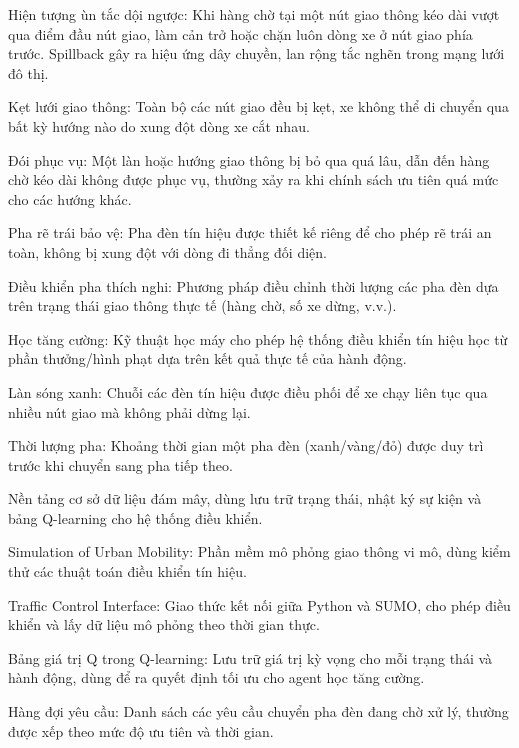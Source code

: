 \documentclass[12pt,a4paper,oneside]{report}
\begin{document}
\begin{description}[leftmargin=2.5em,style=nextline]
    \item[\textbf{Spillback}] Hiện tượng ùn tắc dội ngược: Khi hàng chờ tại một nút giao thông kéo dài vượt qua điểm đầu nút giao, làm cản trở hoặc chặn luôn dòng xe ở nút giao phía trước. Spillback gây ra hiệu ứng dây chuyền, lan rộng tắc nghẽn trong mạng lưới đô thị.
    \item[\textbf{Gridlock}] Kẹt lưới giao thông: Toàn bộ các nút giao đều bị kẹt, xe không thể di chuyển qua bất kỳ hướng nào do xung đột dòng xe cắt nhau.
    \item[\textbf{Starvation}] Đói phục vụ: Một làn hoặc hướng giao thông bị bỏ qua quá lâu, dẫn đến hàng chờ kéo dài không được phục vụ, thường xảy ra khi chính sách ưu tiên quá mức cho các hướng khác.
    \item[\textbf{Protected left}] Pha rẽ trái bảo vệ: Pha đèn tín hiệu được thiết kế riêng để cho phép rẽ trái an toàn, không bị xung đột với dòng đi thẳng đối diện.
    \item[\textbf{Adaptive Phase Control (APC)}] Điều khiển pha thích nghi: Phương pháp điều chỉnh thời lượng các pha đèn dựa trên trạng thái giao thông thực tế (hàng chờ, số xe dừng, v.v.).
    \item[\textbf{Reinforcement Learning (RL)}] Học tăng cường: Kỹ thuật học máy cho phép hệ thống điều khiển tín hiệu học từ phần thưởng/hình phạt dựa trên kết quả thực tế của hành động.
    \item[\textbf{Green wave}] Làn sóng xanh: Chuỗi các đèn tín hiệu được điều phối để xe chạy liên tục qua nhiều nút giao mà không phải dừng lại.
    \item[\textbf{Phase duration}] Thời lượng pha: Khoảng thời gian một pha đèn (xanh/vàng/đỏ) được duy trì trước khi chuyển sang pha tiếp theo.
    \item[\textbf{Supabase}] Nền tảng cơ sở dữ liệu đám mây, dùng lưu trữ trạng thái, nhật ký sự kiện và bảng Q-learning cho hệ thống điều khiển.
    \item[\textbf{SUMO}] Simulation of Urban Mobility: Phần mềm mô phỏng giao thông vi mô, dùng kiểm thử các thuật toán điều khiển tín hiệu.
    \item[\textbf{TraCI}] Traffic Control Interface: Giao thức kết nối giữa Python và SUMO, cho phép điều khiển và lấy dữ liệu mô phỏng theo thời gian thực.
    \item[\textbf{Q-table}] Bảng giá trị Q trong Q-learning: Lưu trữ giá trị kỳ vọng cho mỗi trạng thái và hành động, dùng để ra quyết định tối ưu cho agent học tăng cường.
    \item[\textbf{Pending requests}] Hàng đợi yêu cầu: Danh sách các yêu cầu chuyển pha đèn đang chờ xử lý, thường được xếp theo mức độ ưu tiên và thời gian.
\end{description}
\end{document}
